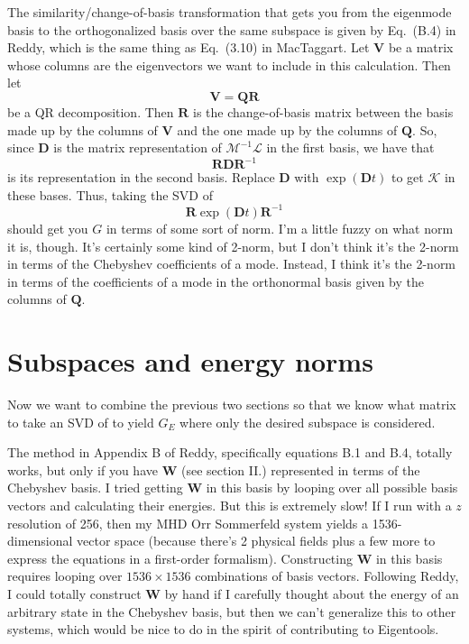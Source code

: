 \documentclass[aps,pop,preprint]{revtex4}
\begin{document}
The similarity/change-of-basis transformation that gets you from the eigenmode basis to the orthogonalized basis over the same subspace is given by Eq.~(B.4) in Reddy, which is the same thing as Eq.~(3.10) in MacTaggart. 
Let $\mathbf{V}$ be a matrix whose columns are the eigenvectors we want to include in this calculation. 
Then let
\begin{equation}
\mathbf{V} = \mathbf{QR}
\end{equation}
be a QR decomposition. 
Then $\mathbf{R}$ is the change-of-basis matrix between the basis made up by the columns of $\mathbf{V}$ and the one made up by the columns of $\mathbf{Q}$. 
So, since $\mathbf{D}$ is the matrix representation of $\mathcal{M}^{-1}\mathcal{L}$ in the first basis, we have that
\begin{equation}
\mathbf{R} \mathbf{D} \mathbf{R}^{-1}
\end{equation}
is its representation in the second basis. 
Replace $\mathbf{D}$ with $\exp(\mathbf{D} t)$ to get $\mathcal{K}$ in these bases. 
Thus, taking the SVD of
\begin{equation}
\mathbf{R} \exp(\mathbf{D} t) \mathbf{R}^{-1}
\end{equation}
should get you $G$ in terms of some sort of norm. 
I'm a little fuzzy on what norm it is, though. 
It's certainly some kind of 2-norm, but I don't think it's the 2-norm in terms of the Chebyshev coefficients of a mode. 
Instead, I think it's the 2-norm in terms of the coefficients of a mode in the orthonormal basis given by the columns of $\mathbf{Q}$.

\section{Subspaces and energy norms}
Now we want to combine the previous two sections so that we know what matrix to take an SVD of to yield $G_E$ where only the desired subspace is considered. 

The method in Appendix B of Reddy, specifically equations B.1 and B.4, totally works, but only if you have $\mathbf{W}$ (see section II.) represented in terms of the Chebyshev basis. 
I tried getting $\mathbf{W}$ in this basis by looping over all possible basis vectors and calculating their energies. 
But this is extremely slow! 
If I run with a $z$ resolution of 256, then my MHD Orr Sommerfeld system yields a 1536-dimensional vector space (because there's 2 physical fields plus a few more to express the equations in a first-order formalism). 
Constructing $\mathbf{W}$ in this basis requires looping over $1536 \times 1536$ combinations of basis vectors. 
Following Reddy, I could totally construct $\mathbf{W}$ by hand if I carefully thought about the energy of an arbitrary state in the Chebyshev basis, but then we can't generalize this to other systems, which would be nice to do in the spirit of contributing to Eigentools. 
\end{document}
